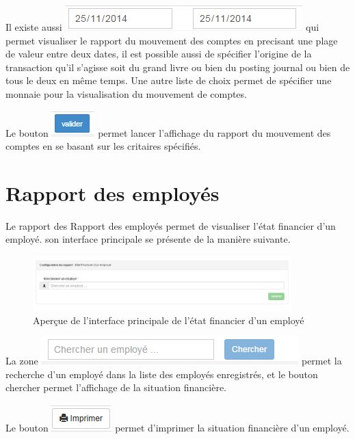\documentclass[12pt,a4paper]{report}
\begin{document}
Il existe aussi  \includegraphics[scale=0.7]{pic/PlageTimes.png} qui permet visualiser le rapport du mouvement des comptes en precisant une plage de valeur entre deux dates, il est possible aussi de spécifier l'origine de la transaction qu'il s'agisse soit du grand livre ou bien du posting journal ou bien de tous le deux en même temps. Une autre liste de choix permet de spécifier une monnaie pour la visualisation du mouvement de comptes.

Le bouton \includegraphics[scale=0.7]{pic/ValiderBlue.png} permet lancer l'affichage du rapport du mouvement des comptes en se basant sur les critaires spécifiés.



\newpage
\section{Rapport des employés}
Le rapport des Rapport des employés permet de visualiser l'état financier d'un employé. son interface principale se présente de la manière suivante. 

\begin{figure}[h]
\begin{center}
\includegraphics[width=10cm]{pic/EtFinEMp.png}
\end{center}
\caption{Aperçue de l'interface principale de l'état financier d'un employé}
\label{Aperçue de l'interface principale de l'état financier d'un employé}
\end{figure}


La zone  \includegraphics[scale=0.7]{pic/ChechEmp.png} permet la recherche d'un employé dans la liste des employés enregistrés, et le bouton chercher permet l'affichage de la situation financière.

Le bouton \includegraphics[scale=0.7]{pic/Print.png} permet d'imprimer la situation financière d'un employé.
\end{document}
